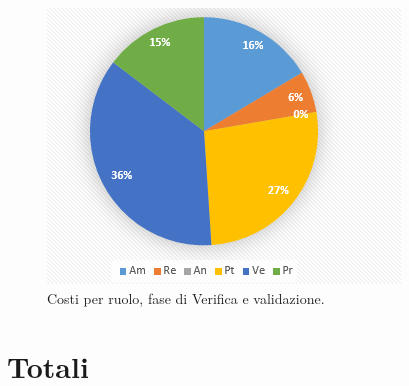 \documentclass[a4paper]{report}
\begin{document}
			\begin{figure}[H]
				\centering
				\includegraphics[scale=0.7]{PCCostiValidazione}
				\caption{Costi per ruolo, fase di Verifica e validazione.}
			\end{figure}
		\section{Totali}
\end{document}
